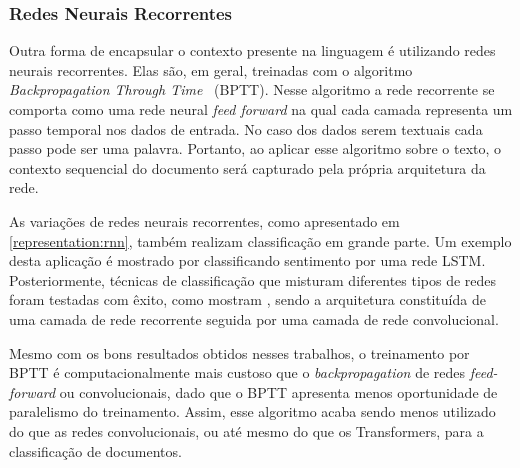 \subsubsection{Redes Neurais Recorrentes}

Outra forma de encapsular o contexto presente na linguagem é utilizando redes
neurais recorrentes.
Elas são, em geral, treinadas com o algoritmo
\textit{Backpropagation Through Time}~\cite{williams95} (BPTT).
Nesse algoritmo a rede recorrente se comporta como uma rede neural
\textit{feed forward} na qual cada camada representa um passo temporal nos dados
de entrada.
No caso dos dados serem textuais cada passo pode ser uma palavra.
Portanto, ao aplicar esse algoritmo sobre o texto, o contexto sequencial do
documento será capturado pela própria arquitetura da rede.

As variações de redes neurais recorrentes, como apresentado em
\ref{representation:rnn}, também realizam classificação em grande parte.
Um exemplo desta aplicação é mostrado por \citet{tai15} classificando sentimento
por uma rede LSTM.
Posteriormente, técnicas de classificação que misturam diferentes tipos de redes
foram testadas com êxito, como mostram \citet{zhou16}, sendo a arquitetura
constituída de uma camada de rede recorrente seguida por uma camada de rede
convolucional.

Mesmo com os bons resultados obtidos nesses trabalhos, o treinamento por BPTT é
computacionalmente mais custoso que o \textit{backpropagation} de redes
\textit{feed-forward} ou convolucionais, dado que o BPTT apresenta menos
oportunidade de paralelismo do treinamento.
Assim, esse algoritmo acaba sendo menos utilizado do que as redes
convolucionais, ou até mesmo do que os Transformers, para a classificação de documentos.

%
%
